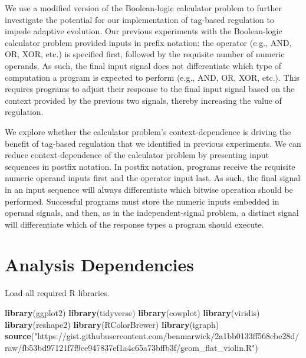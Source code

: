 \documentclass[]{book}
\newenvironment{Shaded}{\begin{snugshade}}{\end{snugshade}}
\newcommand{\KeywordTok}[1]{\textcolor[rgb]{0.13,0.29,0.53}{\textbf{#1}}}
\newcommand{\NormalTok}[1]{#1}
\newcommand{\StringTok}[1]{\textcolor[rgb]{0.31,0.60,0.02}{#1}}
\begin{document}
We use a modified version of the Boolean-logic calculator problem to further investigate the potential for our implementation of tag-based regulation to impede adaptive evolution.
Our previous experiments with the Boolean-logic calculator problem provided inputs in prefix notation: the operator (e.g., AND, OR, XOR, etc.) is specified first, followed by the requisite number of numeric operands.
As such, the final input signal does not differentiate which type of computation a program is expected to perform (e.g., AND, OR, XOR, etc.).
This requires programs to adjust their response to the final input signal based on the context provided by the previous two signals, thereby increasing the value of regulation.

We explore whether the calculator problem's context-dependence is driving the benefit of tag-based regulation that we identified in previous experiments.
We can reduce context-dependence of the calculator problem by presenting input sequences in postfix notation.
In postfix notation, programs receive the requisite numeric operand inputs first and the operator input last.
As such, the final signal in an input sequence will always differentiate which bitwise operation should be performed.
Successful programs must store the numeric inputs embedded in operand signals, and then, as in the independent-signal problem, a distinct signal will differentiate which of the response types a program should execute.

\hypertarget{analysis-dependencies-5}{%
\section{Analysis Dependencies}\label{analysis-dependencies-5}}

Load all required R libraries.

\begin{Shaded}
\begin{Highlighting}[]
\KeywordTok{library}\NormalTok{(ggplot2)}
\KeywordTok{library}\NormalTok{(tidyverse)}
\KeywordTok{library}\NormalTok{(cowplot)}
\KeywordTok{library}\NormalTok{(viridis)}
\KeywordTok{library}\NormalTok{(reshape2)}
\KeywordTok{library}\NormalTok{(RColorBrewer)}
\KeywordTok{library}\NormalTok{(igraph)}
\KeywordTok{source}\NormalTok{(}\StringTok{"https://gist.githubusercontent.com/benmarwick/2a1bb0133ff568cbe28d/raw/fb53bd97121f7f9ce947837ef1a4c65a73bffb3f/geom_flat_violin.R"}\NormalTok{)}
\end{Highlighting}
\end{Shaded}
\end{document}
